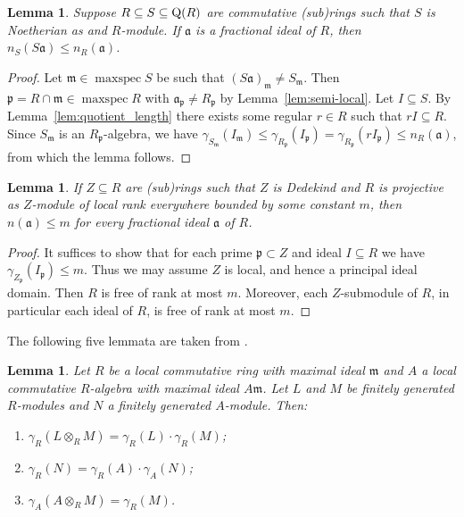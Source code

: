 \documentclass{amsart}
\theoremstyle{plain}
\newtheorem{lemma}[theorem]{Lemma}
\theoremstyle{definition}
\DeclareMathOperator{\maxspec}{maxspec}
\newcommand{\tensor}{\otimes}
\newcommand{\m}{\ensuremath{\mathfrak{m}}}
\newcommand{\p}{\ensuremath{\mathfrak{p}}}
\newcommand{\fm}{\ensuremath{\mathfrak{m}}}
\begin{document}
\begin{lemma}\label{lem:iota_ineq}
Suppose \(R\subseteq S\subseteq\textup{Q}(R)\) are commutative (sub)rings such that \(S\) is Noetherian as and \(R\)-module.
If \(\mathfrak{a}\) is a fractional ideal of \(R\), then \(n_S(S\mathfrak{a})\leq n_R(\mathfrak{a})\). 
\end{lemma}
\begin{proof}
Let \(\m\in\maxspec S\) be such that \((S\mathfrak{a})_\m\neq S_\m\). Then \(\p=R\cap \m\in\maxspec R\) with \(\mathfrak{a}_\p\neq R_\p\) by Lemma~\ref{lem:semi-local}.
Let \(I\subseteq S\). 
By Lemma~\ref{lem:quotient_length} there exists some regular \(r\in R\) such that \(rI\subseteq R\).
Since \(S_\m\) is an \(R_\p\)-algebra, we have \(\gamma_{S_\m}(I_\m)\leq \gamma_{R_\p}(I_\p) = \gamma_{R_\p}(rI_\p) \leq n_R(\mathfrak{a})\), from which the lemma follows.
\end{proof}

\begin{lemma}\label{lem:iota_bound_basis}
If \(Z\subseteq R\) are (sub)rings such that \(Z\) is Dedekind and \(R\) is projective as \(Z\)-module of local rank everywhere bounded by some constant \(m\), then \(n(\mathfrak{a})\leq m\) for every fractional ideal \(\mathfrak{a}\) of \(R\). 
\end{lemma}
\begin{proof}
It suffices to show that for each prime \(\p\subset Z\) and ideal \(I\subseteq R\) we have \(\gamma_{Z_\p}(I_\p)\leq m\).
Thus we may assume \(Z\) is local, and hence a principal ideal domain.  
Then \(R\) is free of rank at most \(m\).
Moreover, each \(Z\)-submodule of \(R\), in particular each ideal of \(R\), is free of rank at most \(m\).
\end{proof}

The following five lemmata are taken from \cite[Section~4]{lecture}.

\begin{lemma}\label{lem:min_gen}
Let \(R\) be a local commutative ring with maximal ideal \(\fm\) and \(A\) a local commutative \(R\)-algebra with maximal ideal \(A\fm\).
Let \(L\) and \(M\) be finitely generated \(R\)-modules and \(N\) a finitely generated \(A\)-module. 
Then:
\begin{enumerate}[label=\textup{(\roman*)}]
\item \(\gamma_R(L\tensor_R M)=\gamma_R(L)\cdot\gamma_R(M)\);
\item \(\gamma_R(N)=\gamma_R(A)\cdot\gamma_A(N)\);
\item \(\gamma_A(A\tensor_R M)=\gamma_R(M)\).
\end{enumerate}
\end{lemma}
\end{document}
